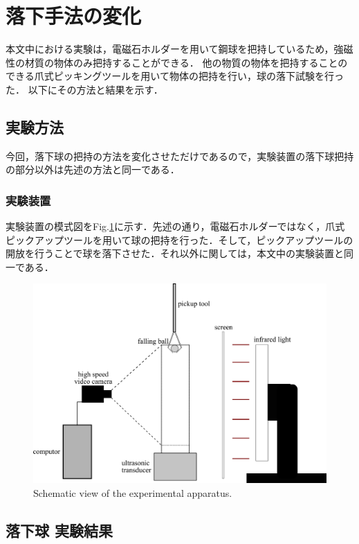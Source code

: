 \section{落下手法の変化}

本文中における実験は，電磁石ホルダーを用いて鋼球を把持しているため，強磁性の材質の物体のみ把持することができる．
他の物質の物体を把持することのできる爪式ピッキングツールを用いて物体の把持を行い，球の落下試験を行った．
以下にその方法と結果を示す．

\subsection{実験方法}

今回，落下球の把持の方法を変化させただけであるので，実験装置の落下球把持の部分以外は先述の方法と同一である．

\subsubsection{実験装置}

実験装置の模式図をFig.\ref{fig:device2}に示す．先述の通り，電磁石ホルダーではなく，爪式ピックアップツールを用いて球の把持を行った．そして，ピックアップツールの開放を行うことで球を落下させた．それ以外に関しては，本文中の実験装置と同一である．

\begin{figure}[h]
    \centering
    \includegraphics[clip,width=12.0cm]{X-Appendix/device.png}
    \caption{Schematic view of the experimental apparatus.}
    \label{fig:device2}
\end{figure}

\subsection{落下球 実験結果}

